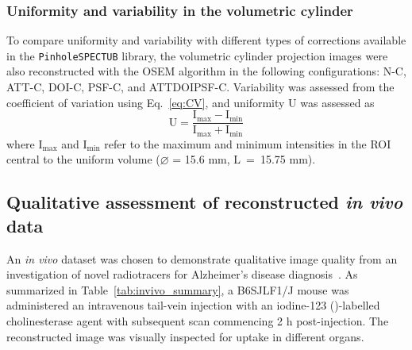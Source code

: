 \documentclass[utf8]{FrontiersinVancouver}
\begin{document}
\subsubsection{Uniformity and variability in the volumetric cylinder}

To compare uniformity and variability with different types of corrections available in the \texttt{PinholeSPECTUB} library, the volumetric cylinder projection images were also reconstructed with the OSEM algorithm in the following configurations: N-C, ATT-C, DOI-C, PSF-C, and \mbox{ATTDOIPSF-C}. Variability was assessed from the coefficient of variation using Eq.~\ref{eq:CV}, and uniformity $\mathrm{U}$ was assessed as
\begin{equation}
	\mathrm{U} = \frac{\mathrm{I_{max}} - \mathrm{I_{min}}}{\mathrm{I_{max}} + \mathrm{I_{min}}}
\end{equation}
where $\mathrm{I_{max}}$ and $\mathrm{I_{min}}$ refer to the maximum and minimum intensities in the ROI central to the uniform volume ($\diameter$ = 15.6 mm, $\mathrm{L}$~=~15.75 mm). 




\subsection{Qualitative assessment of reconstructed \textit{in vivo} data}

An \textit{in vivo} dataset was chosen to demonstrate qualitative image quality from an investigation of novel radiotracers for Alzheimer's disease diagnosis~\citep{macdonald_early_2014, debay_targeting_2017}. As summarized in Table~\ref{tab:invivo_summary}, a B6SJLF1/J mouse was administered an intravenous tail-vein injection with an iodine-123 ()-labelled cholinesterase agent with subsequent scan commencing 2 h post-injection. The reconstructed image was visually inspected for uptake in different organs.
\end{document}
